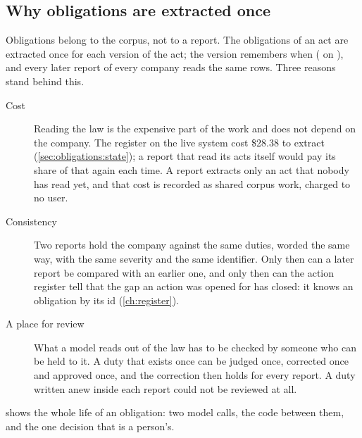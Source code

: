 \subsection{Why obligations are extracted once}\label{sec:obligations:once}

Obligations belong to the corpus, not to a report. The obligations of an act are extracted once
for each version of the act; the version remembers when ( on
), and every later report of every company reads the same rows.
Three reasons stand behind this.

\begin{description}
  \item[Cost] Reading the law is the expensive part of the work and does not depend on the
    company. The register on the live system cost \$28.38 to extract
    (\cref{sec:obligations:state}); a report that read its acts itself would pay its share of
    that again each time. A report extracts only an act that nobody has read yet, and that
    cost is recorded as shared corpus work, charged to no user.
  \item[Consistency] Two reports hold the company against the same duties, worded the same
    way, with the same severity and the same identifier. Only then can a later report be
    compared with an earlier one, and only then can the action register tell that the gap an
    action was opened for has closed: it knows an obligation by its id (\cref{ch:register}).
  \item[A place for review] What a model reads out of the law has to be checked by someone who
    can be held to it. A duty that exists once can be judged once, corrected once and approved
    once, and the correction then holds for every report. A duty written anew inside each
    report could not be reviewed at all.
\end{description}

 shows the whole life of an obligation: two model calls, the code
between them, and the one decision that is a person's.

